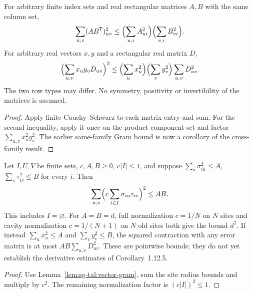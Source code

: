 \begin{lemma}\label{lem:sg-tal:vector-gram}
\leanok
{}
For arbitrary finite index sets and real rectangular matrices $A,B$ with the same
column set,
\[
\sum_{u,v}(AB^\mathsf T)_{uv}^2
\le\Bigl(\sum_{u,i}A_{ui}^2\Bigr)\Bigl(\sum_{v,i}B_{vi}^2\Bigr).
\]
For arbitrary real vectors $x,y$ and a rectangular real matrix $D$,
\[
\Bigl(\sum_{u,v}x_u y_v D_{uv}\Bigr)^2
\le\Bigl(\sum_u x_u^2\Bigr)\Bigl(\sum_v y_v^2\Bigr)\sum_{u,v}D_{uv}^2.
\]
The two row types may differ. No symmetry, positivity or invertibility of the matrices is assumed.
\end{lemma}
\begin{proof}
\leanok
Apply finite Cauchy--Schwarz to each matrix entry and sum. For the second inequality,
apply it once on the product component set and factor $\sum_{u,v}x_u^2y_v^2$.
The earlier same-family Gram bound is now a corollary of the cross-family result.
\end{proof}

\begin{lemma}\label{lem:sg-tal:vector-overlap-bound}
\leanok
{}
Let $I,U,V$ be finite sets, $c,A,B\ge0$, $c|I|\le1$, and suppose
$\sum_u\sigma_{iu}^2\le A$, $\sum_v\tau_{iv}^2\le B$ for every $i$.
Then
\[
\sum_{u,v}\Bigl(c\sum_{i\in I}\sigma_{iu}\tau_{iv}\Bigr)^2\le AB.
\]
This includes $I=\varnothing$. For $A=B=d$, full normalization $c=1/N$ on $N$ sites
and cavity normalization $c=1/(N+1)$ on $N$ old sites both give the bound $d^2$.
If instead $\sum_u x_u^2\le A$ and $\sum_v y_v^2\le B$, the squared contraction
with any error matrix is at most $AB\sum_{u,v}D_{uv}^2$.
These are pointwise bounds; they do not yet establish the derivative estimates of Corollary~1.12.5.
\end{lemma}
\begin{proof}
\leanok
Use Lemma~\ref{lem:sg-tal:vector-gram}, sum the site radius bounds and multiply by $c^2$.
The remaining normalization factor is $(c|I|)^2\le1$.
\end{proof}

